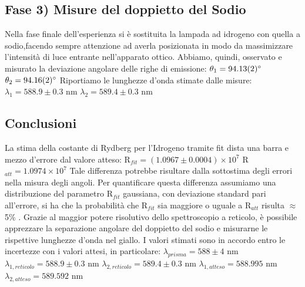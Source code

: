 \documentclass[10pt,a4paper]{article}
\begin{document}
\subsection*{Fase 3) Misure del doppietto del Sodio}
Nella fase finale dell'esperienza si \`e sostituita la lampada ad idrogeno con quella a sodio,facendo sempre attenzione ad averla posizionata in modo da massimizzare l'intensità di luce entrante nell'apparato ottico. Abbiamo, quindi, osservato e misurato la deviazione angolare delle righe di emissione:\newline\newline
$\theta_1 =\ang{ 94.13 \pm 0.02}$\newline
$\theta_2 =\ang{ 94.16 \pm 0.02}$\newline\newline
Riportiamo le lunghezze d'onda stimate dalle misure:\newline\newline
$\lambda_1 = 588.9 \pm 0.3$ nm\newline 
$\lambda_2 = 589.4 \pm 0.3$ nm
\subsection*{Conclusioni}
La stima della costante di Rydberg per l'Idrogeno tramite fit dista una barra e mezzo d'errore dal valore atteso:\newline\newline
R$_{fit} = (1.0967 \pm 0.0004)\times{10^7}$\newline
R$_{att} = 1.0974 \times{10^7}$\newline\newline
Tale differenza potrebbe risultare dalla sottostima degli errori nella misura degli angoli. Per quantificare questa differenza assumiamo una distribuzione del parametro R$_{fit}$ gaussiana, con deviazione standard pari all'errore, si ha che la probabilità che R$_{fit}$ sia maggiore o uguale a R$_{att}$ risulta $\approx$ 5\% .\newline
Grazie al maggior potere risolutivo dello spettroscopio a reticolo, \`e possibile apprezzare la separazione angolare del doppietto del sodio e misurarne le rispettive lunghezze d'onda nel giallo. I valori stimati sono in accordo entro le incertezze con i valori attesi, in particolare:\newline
$\lambda_{prisma} = 588 \pm 4$ nm \newline
$\lambda_{1, reticolo} = 588.9 \pm 0.3$ nm\newline 
$\lambda_{2, reticolo} = 589.4 \pm 0.3$ nm\newline
$\lambda_{1, atteso} = 588.995$ nm\newline
$\lambda_{2, atteso} = 589.592$ nm
\end{document}
